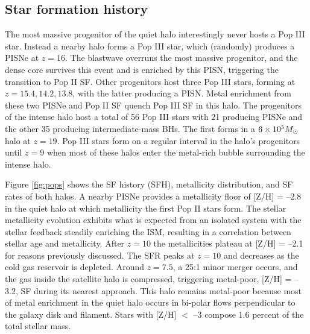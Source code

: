\documentclass[apjl]{emulateapj}
\begin{document}
\subsection{Star formation history}
\label{sec:pop}

The most massive progenitor of the quiet halo interestingly never
hosts a Pop III star.  Instead a nearby halo forms a Pop III star,
which (randomly) produces a PISNe at $z=16$.  The blastwave overruns
the most massive progenitor, and the dense core survives this event
and is enriched by this PISN, triggering the transition to Pop II SF.
Other progenitors host three Pop III stars, forming at $z = 15.4,
14.2, 13.8$, with the latter producing a PISN.  Metal enrichment from
these two PISNe and Pop II SF quench Pop III SF in this halo.  The
progenitors of the intense halo host a total of 56 Pop III stars with
21 producing PISNe and the other 35 producing intermediate-mass BHs.
The first forms in a $6 \times 10^5 \Ms$ halo at $z=19$.  Pop III
stars form on a regular interval in the halo's progenitors until $z=9$
when most of these halos enter the metal-rich bubble surrounding the
intense halo.



Figure \ref{fig:pops} shows the SF history (SFH), metallicity
distribution, and SF rates of both halos.  A nearby PISNe provides a
metallicity floor of [Z/H] = --2.8 in the quiet halo at which
metallicity the first Pop II stars form.  The stellar metallicity
evolution exhibits what is expected from an isolated system with the
stellar feedback steadily enriching the ISM, resulting in a
correlation between stellar age and metallicity.  After $z=10$ the
metallicities plateau at [Z/H] = --2.1 for reasons previously
discussed.  The SFR peaks at $z=10$ and decreases as the cold gas
reservoir is depleted.  Around $z=7.5$, a 25:1 minor merger occurs,
and the gas inside the satellite halo is compressed, triggering
metal-poor, [Z/H] = --3.2, SF during its nearest approach.  This halo
remains metal-poor because most of metal enrichment in the quiet halo
occurs in bi-polar flows perpendicular to the galaxy disk and
filament.  Stars with [Z/H] $<$ --3 compose 1.6 percent of the total
stellar mass.
       
\end{document}

